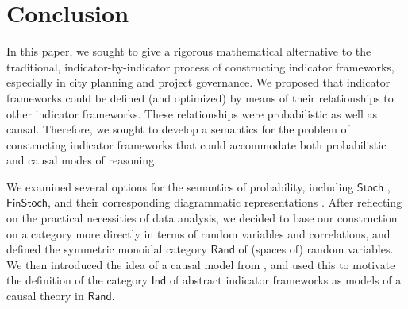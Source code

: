 \documentclass[sigconf]{acmart}
\newcommand{\Cat}[1]{\mathsf{#1}}
\def\Ind{\Cat{Ind}}
\def\Rand{\Cat{Rand}}
\def\Stoch{\Cat{Stoch}}
\def\FinStoch{\Cat{FinStoch}}
\begin{document}





\section{Conclusion}
In this paper, we sought to give a rigorous mathematical alternative to the traditional, indicator-by-indicator process of constructing indicator frameworks, especially in city planning and project governance. We proposed that indicator frameworks could be defined (and optimized) by means of their relationships to other indicator frameworks. These relationships were probabilistic as well as causal. Therefore, we sought to develop a semantics for the problem of constructing indicator frameworks that could accommodate both probabilistic and causal modes of reasoning.

We examined several options for the semantics of probability, including $\Stoch$ \cite{lawvere62}, $\FinStoch$, and their corresponding diagrammatic representations \cite{coecke_spekkens}. After reflecting on the practical necessities of data analysis, we decided to base our construction on a category more directly in terms of random variables and correlations, and defined the symmetric monoidal category $\Rand$ of (spaces of) random variables. We then introduced the idea of a causal model from \cite{fong13}, and used this to motivate the definition of the category $\Ind$ of abstract indicator frameworks as models of a causal theory in $\Rand$.
\end{document}
